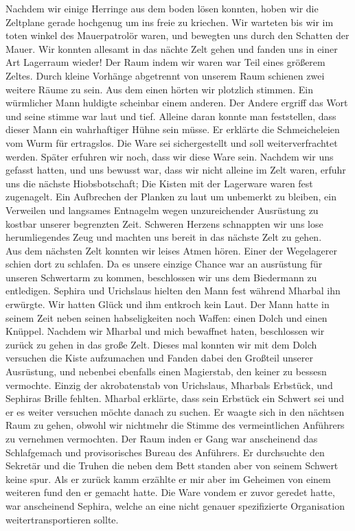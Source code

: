 \documentclass{book}
\begin{document}
    Nachdem wir einige Herringe aus dem boden lösen konnten, hoben wir die Zeltplane gerade hochgenug um ins freie zu kriechen. Wir warteten bis wir im toten winkel des Mauerpatrolör waren, und bewegten uns durch den Schatten der Mauer. Wir konnten allesamt in das nächte Zelt gehen und fanden uns in einer Art Lagerraum wieder! Der Raum indem wir waren war Teil eines größerem Zeltes. Durch kleine Vorhänge abgetrennt von unserem Raum schienen zwei weitere Räume zu sein. Aus dem einen hörten wir plotzlich stimmen. Ein würmlicher Mann huldigte scheinbar einem anderen. Der Andere ergriff das Wort und seine stimme war laut und tief. Alleine daran konnte man feststellen, dass dieser Mann ein wahrhaftiger Hühne sein müsse. Er erklärte die Schmeicheleien vom Wurm für ertragslos. Die Ware sei sichergestellt und soll weiterverfrachtet werden. Später erfuhren wir noch, dass wir diese Ware sein. Nachdem wir uns gefasst hatten, und uns bewusst war, dass wir nicht alleine im Zelt waren, erfuhr uns die nächste Hiobsbotschaft; Die Kisten mit der Lagerware waren fest zugenagelt. Ein Aufbrechen der Planken zu laut um unbemerkt zu bleiben, ein Verweilen und langsames Entnagelm wegen unzureichender Ausrüstung zu kostbar unserer begrenzten Zeit. Schweren Herzens schnappten wir uns lose herumliegendes Zeug und machten uns bereit in das nächste Zelt zu gehen.\\
Aus dem nächsten Zelt konnten wir leises Atmen hören. Einer der Wegelagerer schien dort zu schlafen. Da es unsere einzige Chance war an ausrüstung für unseren Schwertarm zu kommen, beschlossen wir uns dem Biedermann zu entledigen. Sephira und Urichslaus hielten den Mann fest während Mharbal ihn erwürgte. Wir hatten Glück und ihm entkroch kein Laut. Der Mann hatte in seinem Zeit neben seinen habseligkeiten noch Waffen: einen Dolch und einen Knüppel. Nachdem wir Mharbal und mich bewaffnet haten, beschlossen wir zurück zu gehen in das große Zelt. Dieses mal konnten wir mit dem Dolch versuchen die Kiste aufzumachen und Fanden dabei den Großteil unserer Ausrüstung, und nebenbei ebenfalls einen Magierstab, den keiner zu bessesn vermochte. Einzig der akrobatenstab von Urichslaus, Mharbals Erbstück, und Sephiras Brille fehlten. Mharbal  erklärte, dass sein Erbstück ein Schwert sei und er es weiter versuchen möchte danach zu suchen. Er waagte sich in den nächtsen Raum zu gehen, obwohl wir nichtmehr die Stimme des vermeintlichen Anführers zu vernehmen vermochten. Der Raum inden er Gang war anscheinend das Schlafgemach und provisorisches Bureau des Anführers. Er durchsuchte den Sekretär und die Truhen die neben dem Bett standen aber von seinem Schwert keine spur. Als er zurück kamm erzählte er mir aber im Geheimen von einem weiteren fund den er gemacht hatte. Die Ware vondem er zuvor geredet hatte, war anscheinend Sephira, welche an eine nicht genauer spezifizierte Organisation weitertransportieren sollte.\\
\end{document}
